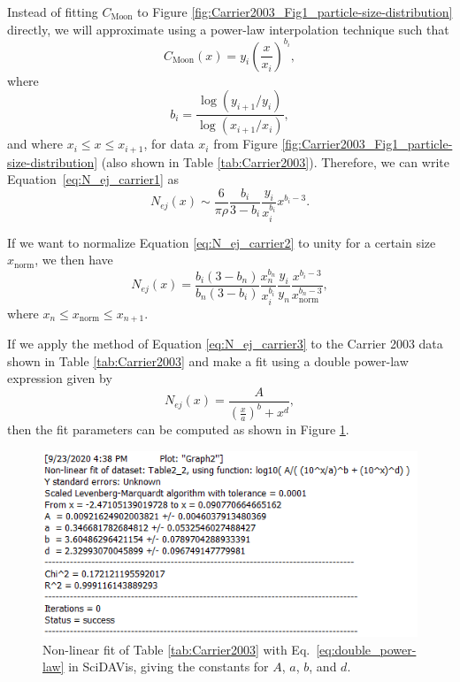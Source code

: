 \documentclass{hitec}
\numberwithin{equation}{section}
\begin{document}
Instead of fitting $C_{\text{Moon}}$ to Figure \ref{fig:Carrier2003_Fig1_particle-size-distribution} directly, we will approximate using a power-law interpolation technique such that
\begin{equation}
C_{\text{Moon}}(x) = y_i\left(\frac{x}{x_i}\right)^{b_i},
\end{equation}
where
\begin{equation}
b_i = \frac{\log(y_{i+1}/y_i)}{\log(x_{i+1}/x_i)},
\end{equation}
and where $x_i \le x \le x_{i+1}$, for data $x_i$ from Figure \ref{fig:Carrier2003_Fig1_particle-size-distribution} (also shown in Table \ref{tab:Carrier2003}). Therefore, we can write Equation~\eqref{eq:N_ej_carrier1} as
\begin{equation}\label{eq:N_ej_carrier2}
N_{ej}(x) \sim \frac{6}{\pi\rho}\frac{b_i}{3-b_i}\frac{y_i}{x_i^{b_i}}x^{b_i-3}.
\end{equation}

If we want to normalize Equation \eqref{eq:N_ej_carrier2} to unity for a certain size $x_{\text{norm}}$, we then have
\begin{equation}\label{eq:N_ej_carrier3}
N_{ej}(x) = \frac{b_i(3-b_n)}{b_n(3-b_i)}\frac{x_n^{b_n}}{x_i^{b_i}}\frac{y_i}{y_n}\frac{x^{b_i-3}}{x_{\text{norm}}^{b_n-3}},
\end{equation}
where $x_n \le x_{\text{norm}} \le x_{n+1}$.

If we apply the method of Equation \eqref{eq:N_ej_carrier3} to the Carrier 2003 data shown in Table \ref{tab:Carrier2003} and make a fit using a double power-law expression given by
\begin{equation}\label{eq:double_power-law}
N_{ej}(x) = \frac{A}{\left(\frac{x}{a}\right)^b + x^d},
\end{equation}
then the fit parameters can be computed as shown in Figure \ref{fig:Fit-to-Nej}.

\begin{figure}[h!]
	\centering
	\includegraphics[scale=1]{Fit-to-Nej.PNG}
	\caption{Non-linear fit of Table \ref{tab:Carrier2003} with Eq.\ \ref{eq:double_power-law} in \textsf{SciDAVis}, giving the constants for $A$, $a$, $b$, and $d$.}\label{fig:Fit-to-Nej}
\end{figure}
\end{document}
